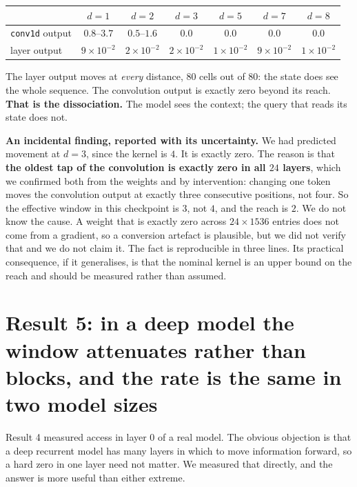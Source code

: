 \documentclass[11pt,a4paper]{article}
\begin{document}
\begin{center}
\begin{tabular}{lcccccc}
\toprule
& $d{=}1$ & $d{=}2$ & $d{=}3$ & $d{=}5$ & $d{=}7$ & $d{=}8$ \\
\midrule
\texttt{conv1d} output & $0.8$--$3.7$ & $0.5$--$1.6$ & $\mathbf{0.0}$ & $\mathbf{0.0}$ & $\mathbf{0.0}$ & $\mathbf{0.0}$ \\
layer output & $9\!\times\!10^{-2}$ & $2\!\times\!10^{-2}$ & $2\!\times\!10^{-2}$ & $1\!\times\!10^{-2}$ & $9\!\times\!10^{-2}$ & $1\!\times\!10^{-2}$ \\
\bottomrule
\end{tabular}
\end{center}

The layer output moves at \emph{every} distance, $80$ cells out of $80$: the state does see the whole
sequence. The convolution output is exactly zero beyond its reach. \textbf{That is the dissociation.}
The model sees the context; the query that reads its state does not.

\textbf{An incidental finding, reported with its uncertainty.} We had predicted movement at $d=3$,
since the kernel is $4$. It is exactly zero. The reason is that \textbf{the oldest tap of the
convolution is exactly zero in all $24$ layers}, which we confirmed both from the weights and by
intervention: changing one token moves the convolution output at exactly three consecutive positions,
not four. So the effective window in this checkpoint is $3$, not $4$, and the reach is $2$. We do not
know the cause. A weight that is exactly zero across $24 \times 1536$ entries does not come from a
gradient, so a conversion artefact is plausible, but we did not verify that and we do not claim it.
The fact is reproducible in three lines. Its practical consequence, if it generalises, is that the
nominal kernel is an upper bound on the reach and should be measured rather than assumed.

\section{Result 5: in a deep model the window attenuates rather than blocks, and the rate is the same in two model sizes}

Result 4 measured access in layer $0$ of a real model. The obvious objection is that a deep recurrent
model has many layers in which to move information forward, so a hard zero in one layer need not
matter. We measured that directly, and the answer is more useful than either extreme.
\end{document}
